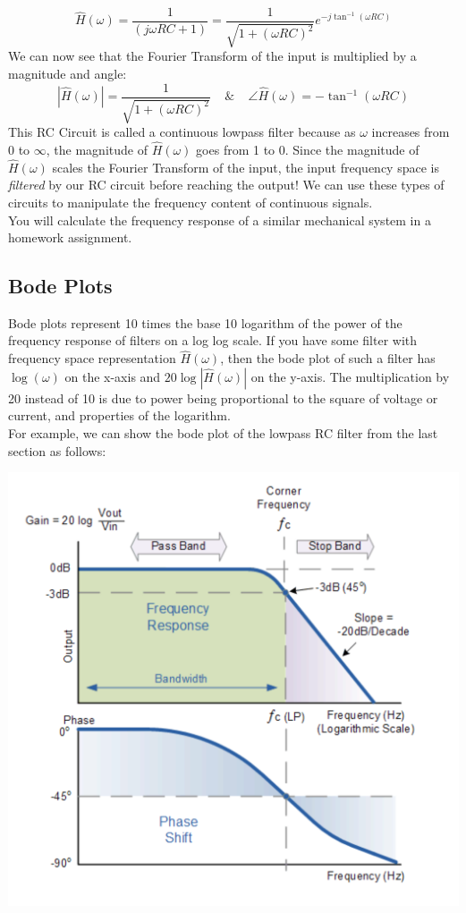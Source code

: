 \documentclass[a4paper]{article}
\numberwithin{equation}{section}
\begin{document}
\begin{equation}
\hat{H}(\omega)=\frac{1}{(j\omega RC +1)}=\frac{1}{\sqrt{1+(\omega RC)^2}}e^{-j\tan^{-1}{(\omega RC)}}
\end{equation}
We can now see that the Fourier Transform of the input is multiplied by a magnitude and angle:
\begin{equation}
|\hat{H}(\omega)|=\frac{1}{\sqrt{1+(\omega RC)^2}} \: \: \: \: \: \& \: \: \: \: \: \angle \hat{H}(\omega) = -\tan^{-1}{(\omega RC)}
\end{equation}
This RC Circuit is called a continuous lowpass filter because as $\omega$ increases from $0$ to $\infty$, the magnitude of $\hat{H}(\omega)$ goes from 1 to 0. Since the magnitude of $\hat{H}(\omega)$ scales the Fourier Transform of the input, the input frequency space is \textit{filtered} by our RC circuit before reaching the output! We can use these types of circuits to manipulate the frequency content of continuous signals.\\

You will calculate the frequency response of a similar mechanical system in a homework assignment. 

\subsection{Bode Plots}
Bode plots represent 10 times the base 10 logarithm of the power of the frequency response of  filters on a log log scale. If you have some filter with frequency space representation $\hat{H}(\omega)$, then the bode plot of such a filter has $\log{(\omega)}$ on the x-axis and $20\log{| \hat{H}(\omega) |}$ on the y-axis. The multiplication by 20 instead of 10 is due to power being proportional to the square of voltage or current, and properties of the logarithm. \\

For example, we can show the bode plot of the lowpass RC filter from the last section as follows:
\begin{center}
\includegraphics[scale=0.5]{bode.png}
\end{center}
\end{document}
